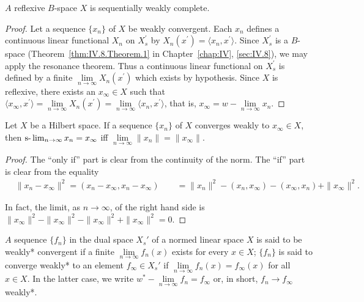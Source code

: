 \begin{theorem}\label{thm:V.1.Theorem.7} $A$ reflexive $B$-space $X$ is sequentially weakly complete. 
\end{theorem}

\begin{proof}
 Let a sequence $\{x_{n}\}$ of $X$ be weakly convergent. Each $x_{n}$ defines a continuous linear functional $X_{n}$ on $X_{s}^{\prime}$ by $X_{n}(x^{\prime}) = \langle x_{n}, x^{\prime} \rangle$. Since $X_{s}^{\prime}$ is a $B$-space (Theorem~\ref{thm:IV.8.Theorem.1} in Chapter~\ref{chap:IV}, \ref{sec:IV.8}), we may apply the resonance theorem. Thus a continuous linear functional on $X_{s}^{\prime}$ is defined by a finite $\lim\limits_{n \to \infty} X_{n}(x^{\prime})$ which exists by hypothesis. Since $X$ is reflexive, there exists an $x_{\infty} \in X$ such that $\langle x_{\infty}, x^{\prime} \rangle = \lim\limits_{n \to \infty} X_{n}(x^{\prime}) = \lim\limits_{n \to \infty} \langle x_{n}, x^{\prime} \rangle$, that is, $x_{\infty} = w - \lim\limits_{n \to \infty} x_{n}$. 
\end{proof}

\begin{theorem}\label{thm:V.1.Theorem.8} Let $X$ be a Hilbert space. If a sequence $\{x_{n}\}$ of $X$ converges weakly to $x_{\infty} \in X$, then $\text{s-}\lim\nolimits_{n \to \infty} x_{n} = x_{\infty}$ iff $\lim\limits_{n \to \infty} \|x_{n}\| = \|x_{\infty}\|$. 
\end{theorem}

\begin{proof}
 The ``only if'' part is clear from the continuity of the norm. The ``if'' part is clear from the equality 
\[ \begin{aligned}
&{\| x _{n} - x _{\infty} \| ^{2} = (x _{n} - x _{\infty}, x _{n} - x _{\infty})} {\qquad = \| x _{n} \| ^{2} - (x _{n}, x _{\infty}) - (x _{\infty}, x _{n}) + \| x _{\infty} \| ^{2}.}
\end{aligned}
\]

In fact, the limit, as $n \to \infty$, of the right hand side is $\| x_{\infty} \|^2 - \| x_{\infty} \|^2 - \| x_{\infty} \|^2 + \| x_{\infty} \|^2 = 0$. 
\end{proof}

\begin{definition}\label{def:V.1.Definition.2} $A$ sequence $\{f_n\}$ in the dual space $X_s'$ of a normed linear space $X$ is said to be weakly* convergent if a finite $\lim\limits_{n\to \infty}f_n(x)$ exists for every $x\in X$; $\{f_n\}$ is said to converge weakly* to an element $f_\infty \in X_s'$ if $\lim\limits_{n\to \infty}f_n(x) = f_\infty (x)$ for all $x\in X$. In the latter case, we write $w^* -\lim\limits_{n\to \infty}f_n = f_\infty$ or, in short, $f_n\to f_\infty$ weakly*. 
\end{definition}

